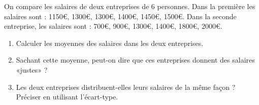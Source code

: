 
\begin{exercice}\label{exosmath-0244}

    On compare les salaires de deux entreprises de \( 6\) personnes. Dans la première les salaires sont :
        1150€,
        1300€,
        1300€,
        1400€,
        1450€,
        1500€.
    Dans la seconde entreprise, les salaires sont :
        700€,
        900€,
        1300€,
        1400€,
        1800€,
        2000€.
    \begin{enumerate}
        \item
            Calculer les moyennes des salaires dans les deux entreprises.
        \item
            Sachant cette moyenne, peut-on dire que ces entreprises donnent des salaires «justes» ?
        \item
            Les deux entreprises distribuent-elles leurs salaires de la même façon ? Préciser en utilisant l'écart-type.
    \end{enumerate}

\end{exercice}
